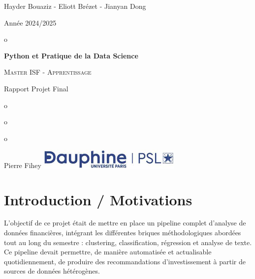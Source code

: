 \documentclass[a4paper,12pt]{article}
\begin{document}
\titleformat{\section}[block]{\normalfont\Large\bfseries}{}{0pt}{}

\begin{titlepage}

	\centering
	

    
    {Hayder Bouaziz - Eliott Brézet - Jianyan Dong}
    \hfill
	{\large Année 2024/2025 \par}

	
	{\phantom o\par}
	\vspace{3cm}
	{\Huge\bfseries Python et Pratique de la Data Science\par}
	\vspace{0.5cm}
	{\scshape\Large Master ISF - Apprentissage \par}
	{Rapport Projet Final\par}
	\vspace{4cm}
	{\phantom o}
	\vspace{1.5cm}

	{\phantom o}
	
	{{\phantom o}}
	\vspace{1cm}

	\vfill
	
  Pierre Fihey \hfill \includegraphics[width = 70mm]{Dauphine.jpg} 
	
	\vspace{0.4cm}
\end{titlepage}


\thispagestyle{empty}

\fancyfoot[C]{}
\clearpage

\fancyfoot[C]{\thepage}

\tableofcontents

\newpage

\clearpage
\thispagestyle{plain}

\section{Introduction / Motivations}

L’objectif de ce projet était de mettre en place un pipeline complet d’analyse de données financières, intégrant les différentes briques méthodologiques abordées tout au long du semestre : clustering, classification, régression et analyse de texte. Ce pipeline devait permettre, de manière automatisée et actualisable quotidiennement, de produire des recommandations d’investissement à partir de sources de données hétérogènes.
\end{document}
